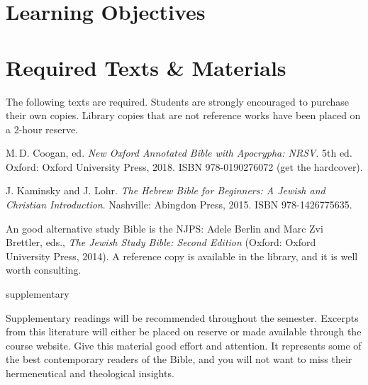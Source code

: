 \documentclass[titlepage]{article}
\newcommand\incl{../includes}
\begin{document}


  \section{Learning Objectives}
  \label{objectives}

  \edobject

\section{Required Texts \& Materials}
\label{texts}

The following texts are required. Students are strongly encouraged to
purchase their own copies. Library copies that are not reference works
have been placed on a 2-hour reserve.

\begingroup
\renewcommand{\section}[2]{}%
\begin{thebibliography}{NRSV}%

	 M.\,D. Coogan, ed.
    \emph{New Oxford Annotated Bible with Apocrypha: NRSV}. 5th ed.
    Oxford: Oxford University Press, 2018.
    ISBN 978-0190276072 (get the hardcover).

	 J. Kaminsky and J. Lohr.
	\emph{The Hebrew Bible for Beginners: A Jewish and Christian Introduction}.
	Nashville: Abingdon Press, 2015.
	ISBN 978-1426775635.

\end{thebibliography}
\endgroup

An good alternative study Bible is the NJPS: Adele Berlin and Marc Zvi
Brettler, eds., \emph{The Jewish Study Bible: Second Edition} (Oxford:
Oxford University Press, 2014). A reference copy is available in the
library, and it is well worth consulting.

\section{Supplementary Texts}
\label{supplementary}

Supplementary readings will be recommended throughout the semester.
Excerpts from this literature will either be placed on reserve or made
available through the course website. Give this material good effort and
attention. It represents some of the best contemporary readers of the
Bible, and you will not want to miss their hermeneutical and theological
insights.
\end{document}
